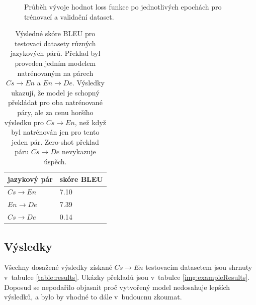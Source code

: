 \begin{figure}[H]
    \begin{center}
    \end{center}
	\caption{Průběh vývoje hodnot loss funkce po jednotlivých epochách pro trénovací a validační dataset.}
\end{figure}

\begin{table}[H]
    \begin{center}
        \begin{tabular}{ll}
          \toprule
          jazykový pár & skóre BLEU \\
          \midrule
          $Cs\rightarrow En$ & 7.10 \\
          $En\rightarrow De$ & 7.39 \\
          $Cs\rightarrow De$ &  0.14 \\
          \bottomrule
        \end{tabular}
    \end{center}
	\caption{Výsledné skóre BLEU pro testovací datasety různých jazykových párů. Překlad byl proveden jedním modelem natrénovaným na párech $Cs\rightarrow En$ a $En\rightarrow De$. Výsledky ukazují, že model je schopný překládat pro oba natrénované páry, ale za cenu horšího výsledku pro $Cs\rightarrow En$, než když byl natrénován jen pro tento jeden pár. Zero-shot překlad páru $Cs\rightarrow De$ nevykazuje úspěch.}
	\label{table:resultsMulti}
\end{table}

\subsection{Výsledky}
Všechny dosažené výsledky získané $Cs\rightarrow En$ testovacím datasetem jsou shrnuty v~tabulce \ref{table:results}. Ukázky překladů jsou v~tabulce \ref{img:exampleResults}. Doposud se nepodařilo objasnit proč vytvořený model nedosahuje lepších výsledků, a bylo by vhodné to dále v~budoucnu zkoumat.

